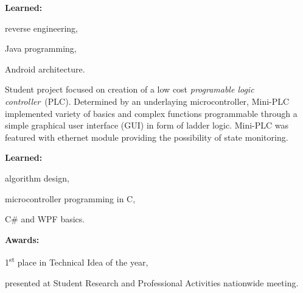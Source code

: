 \documentclass[a4paper]{deedy-resume}
\begin{document}
\vspace{4pt}
\textbf{Learned:}
\begin{tightitemize}
    \item reverse engineering,
    \item Java programming,
    \item Android architecture.
\end{tightitemize}
\sectionspace
\vspace{\topsep}
Student project focused on creation of a low cost \textit{programable logic controller}~(PLC).
Determined by an underlaying microcontroller, Mini-PLC implemented variety of basics and complex functions programmable through a simple graphical user interface (GUI) in form of ladder logic.
Mini-PLC was featured with ethernet module providing the possibility of state monitoring.

\vspace{4pt}
\textbf{Learned:}
\begin{tightitemize}
    \item algorithm design,
    \item microcontroller programming in C,
    \item C\# and WPF basics.
\end{tightitemize}
\vspace{\topsep}
\textbf{Awards:}
\begin{tightitemize}
    \item 1\textsuperscript{st} place in Technical Idea of the year,
    \item presented at Student Research and Professional Activities nationwide meeting.
\end{tightitemize}
\end{document}
